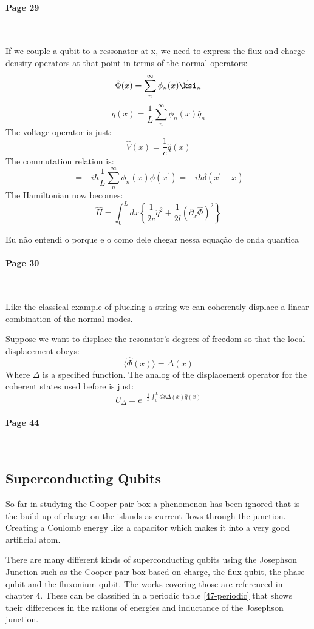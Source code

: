 \documentclass[12pt]{article}
\numberwithin{equation}{subsection}
\newcommand\ask[1]{
{\color{red}
#1
}
}
\newcommand\page[1]{
{
\color{blue}\paragraph{
Page #1
}\mbox{}\\
}
}
\begin{document}
\page{29}
If we couple a qubit to a ressonator at x, we need to express the flux and charge density operators at that point in terms of the normal operators:
\begin{equation}
   \hat \Phi (x) = \sum^\infty_n \phi_n(x)\hat\ksi_n 
\end{equation}
\begin{equation}
   \hat q(x) = \frac{1}{L}\sum^\infty_n \phi_n(x)\hat q_n 
\end{equation}
The voltage operator is just:
\begin{equation}
    \hat V (x) = \frac{1}{c}\hat q(x)
\end{equation}
The commutation relation is:
\begin{equation}
    [\hat q(x), \hat\Phi(x^\prime)] = -i\hbar \frac{1}{L} \sum^\infty_n \phi_n(x)\phi(x^\prime) = -i\hbar \delta(x^\prime - x)
\end{equation}
The Hamiltonian now becomes:
\begin{equation}
    \hat H = \int^L_0 dx \left \{ \frac{1}{2c}\hat q^2 + \frac{1}{2l} (\partial _x \hat \Phi)^2\right\}
\end{equation}
\ask{Eu não entendi o porque e o como dele chegar nessa equação de onda quantica}
\page{30}
Like the classical example of plucking a string we can coherently displace a linear combination of the normal modes.

Suppose we want to displace the resonator's degrees of freedom so that the local displacement obeys: 
\begin{equation}
    \langle \hat \Phi (x)\rangle = \Delta (x)
\end{equation}
Where $\Delta$ is a specified function. The analog of the displacement operator for the coherent states used before is just:
\begin{equation}
    U_\Delta = e^{-\frac{i}{\hbar}\int^L_0 dx \Delta(x)\hat q(x)}
\end{equation}

\page{44}
\subsection{Superconducting Qubits}
So far in studying the Cooper pair box a phenomenon has been ignored that is the build up of charge on the islands as current flows through the junction. Creating a Coulomb energy like a capacitor which makes it into a very good artificial atom.

There are many different kinds of superconducting qubits using the Josephson Junction such as the Cooper pair box based on charge, the flux qubit, the phase qubit and the fluxonium qubit. The works covering those are referenced in \cite{Girvin2015CircuitQS} chapter 4. These can be classified in a periodic table \ref{47-periodic} that shows their differences in the rations of energies and inductance of the Josephson junction.
\end{document}
